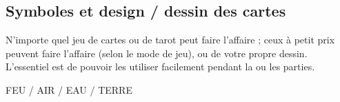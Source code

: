 \documentclass[11pt,twoside,a4paper]{article}
\begin{document}
\subsection{Symboles et design / dessin des cartes}

N'importe quel jeu de cartes ou de tarot peut faire l'affaire ; ceux à petit prix peuvent faire l'affaire (selon le mode de jeu), ou de votre propre dessin. L'essentiel est de pouvoir les utiliser facilement pendant la ou les parties.~\\

\begin{minipage}[ht]{0.45\textwidth}
	FEU / AIR / EAU / TERRE
\end{minipage} \hfill \begin{minipage}[ht]{0.45\textwidth}
	\def\triangle{--++(120:1)--++(240:1)--cycle}
	\def\triangleReverse{--++(240:1)--cycle}
\end{minipage}


\clearpage
\end{document}
